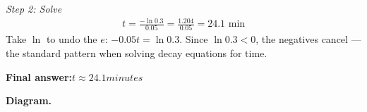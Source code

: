 \documentclass[11pt]{article}
\begin{document}
\textit{Step 2: Solve}
\[\begin{gathered}
t = \frac{-\ln 0.3}{0.05} = \frac{1.204}{0.05} = 24.1 \text{ min}
\end{gathered}\]
Take \( \ln \) to undo the \( e \): \( -0.05t = \ln 0.3 \). Since \( \ln 0.3 < 0 \), the negatives cancel --- the standard pattern when solving decay equations for time.

\begin{answerbox}
\textbf{Final answer:}\quad \(\displaystyle t \approx 24.1 minutes\)
\end{answerbox}
\textbf{Diagram.}

\begin{center}
\end{center}
\end{document}
